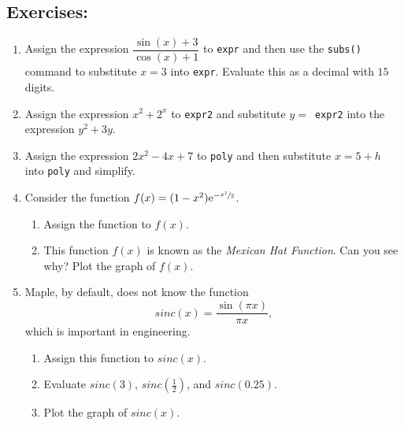 \subsection*{Exercises:}
\begin{enumerate}
    \item Assign the expression $ \dfrac{\sin(x)+3}{\cos(x)+1}$ to \texttt{expr} and then use the \texttt{subs()} command to substitute $x=3$ into \texttt{expr}. Evaluate this as a decimal with $15$ digits.
    \item Assign the expression $x^2+2^x$ to \texttt{expr2} and substitute $y = $~\texttt{expr2} into the expression $y^2+3y$. 
    \item  Assign the expression $2x^2-4x+7$ to \texttt{poly} and then substitute $x=5+h$ into \texttt{poly} and simplify.
    
    \item Consider the function $f(x) = (1-x^2) {\rm e}^{-\sfrac{x^2}{2}}$. 
    \begin{enumerate}
    	\item Assign the function to $f(x)$. 	
   		\item This function $f(x)$ is known as the \textit{Mexican Hat Function}. Can you see why? Plot the graph of $f(x)$.
    \end{enumerate}
    \item Maple, by default, does not know the function
   	\[ sinc(x) = \dfrac{\sin(\pi x)}{\pi x}, \]
   	which is important in engineering. 
   	\begin{enumerate}
	   	\item Assign this function to $sinc(x)$.   	
	   	\item Evaluate $sinc(3)$, $sinc\left(\frac{1}{2}\right)$, and $sinc(0.25)$.
	   	\item Plot the graph of $sinc(x)$.
   	\end{enumerate}
\end{enumerate}